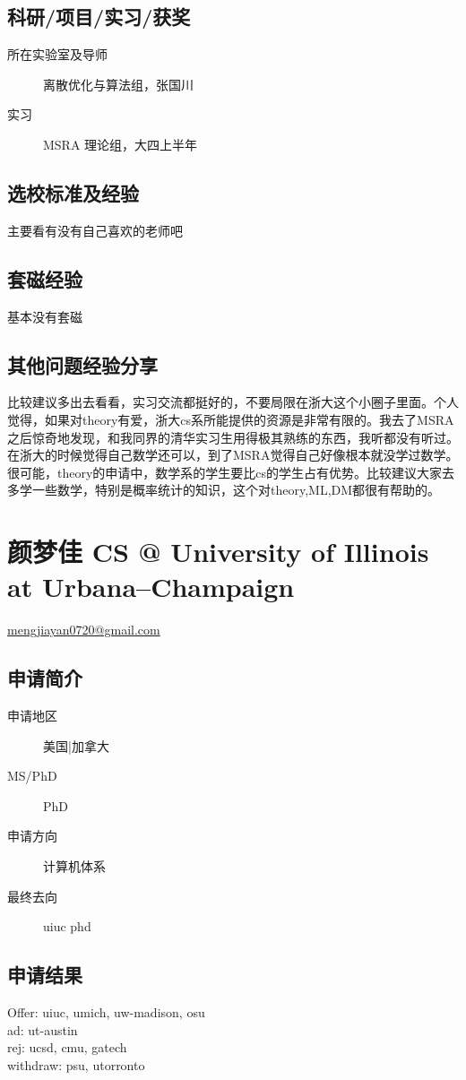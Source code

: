 \documentclass[11pt,fleqn,openany]{book} %
\begin{document}
\subsection*{科研/项目/实习/获奖}
\begin{description}
\item[所在实验室及导师] 离散优化与算法组，张国川
\item[实习] MSRA 理论组，大四上半年
\end{description}
\subsection*{选校标准及经验}
主要看有没有自己喜欢的老师吧
\subsection*{套磁经验}
基本没有套磁
\subsection*{其他问题经验分享}
比较建议多出去看看，实习交流都挺好的，不要局限在浙大这个小圈子里面。个人觉得，如果对theory有爱，浙大cs系所能提供的资源是非常有限的。我去了MSRA之后惊奇地发现，和我同界的清华实习生用得极其熟练的东西，我听都没有听过。在浙大的时候觉得自己数学还可以，到了MSRA觉得自己好像根本就没学过数学。很可能，theory的申请中，数学系的学生要比cs的学生占有优势。比较建议大家去多学一些数学，特别是概率统计的知识，这个对theory,ML,DM都很有帮助的。
\clearpage
\section{颜梦佳 CS @ University of Illinois at Urbana--Champaign}
\hfill \href{mailto:mengjiayan0720@gmail.com}{mengjiayan0720@gmail.com}

\noindent\begin{minipage}[t]{0.45\textwidth}
\subsection*{申请简介}
\begin{description}
\item[申请地区] 美国|加拿大
\item[MS/PhD] PhD
\item[申请方向] 计算机体系
\item[最终去向] uiuc phd
\end{description}
\end{minipage}
\hfill
\begin{minipage}[t]{0.45\textwidth}
\subsection*{申请结果}
\noindent Offer: uiuc, umich, uw-madison, osu\\
ad: ut-austin\\
rej: ucsd, cmu, gatech\\
withdraw: psu, utorronto
\end{minipage}
\end{document}
